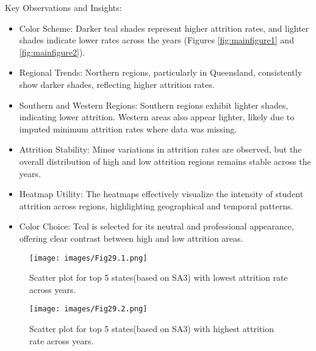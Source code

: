 \documentclass[conference]{IEEEtran}
\begin{document}
Key Observations and Insights: 
\begin{itemize} 
    \item Color Scheme: Darker teal shades represent higher attrition rates, and lighter shades indicate lower rates across the years (Figures \ref{fig:mainfigure1} and \ref{fig:mainfigure2}).
    \item Regional Trends: Northern regions, particularly in Queensland, consistently show darker shades, reflecting higher attrition rates. \item Southern and Western Regions: Southern regions exhibit lighter shades, indicating lower attrition. Western areas also appear lighter, likely due to imputed minimum attrition rates where data was missing.
    \item Attrition Stability: Minor variations in attrition rates are observed, but the overall distribution of high and low attrition regions remains stable across the years. 
    \item Heatmap Utility: The heatmaps effectively visualize the intensity of student attrition across regions, highlighting geographical and temporal patterns. 
    \item Color Choice: Teal is selected for its neutral and professional appearance, offering clear contrast between high and low attrition areas. 
\end{itemize}


\begin{figure}[H]
    \centering
    \texttt{[image: images/Fig29.1.png]}
    \caption{Scatter plot for top 5 states(based on SA3) with lowest attrition rate across years.}
    \label{fig:bubble1}
\end{figure}
\begin{figure}[H]
    \centering
    \texttt{[image: images/Fig29.2.png]}
    \caption{Scatter plot for top 5 states(based on SA3) with highest attrition rate across years.}
    \label{fig:bubble2}
\end{figure}
\end{document}
